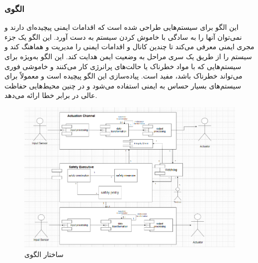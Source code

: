 \subsubsection{الگوی }
\label{archSafeSafetyExecSec}
\begin{RTL}
این الگو \cite{ref4}
برای سیستم‌هایی طراحی شده است که اقدامات ایمنی پیچیده‌ای دارند
و نمی‌توان آنها را به سادگی با خاموش کردن سیستم به دست آورد.
این الگو یک جزء مجری ایمنی معرفی می‌کند تا چندین کانال
و اقدامات ایمنی را مدیریت و هماهنگ کند و سیستم را از طریق
یک سری مراحل به وضعیت ایمن هدایت کند. این الگو به‌ویژه برای سیستم‌هایی
که با مواد خطرناک یا حالت‌های پرانرژی کار می‌کنند و خاموشی فوری می‌تواند
خطرناک باشد، مفید است. پیاده‌سازی این الگو پیچیده است و معمولاً
برای سیستم‌های بسیار حساس به ایمنی استفاده می‌شود و در
چنین محیط‌هایی حفاظت عالی در برابر خطا ارائه می‌دهد.
\end{RTL}
\begin{figure}[h!]
\centering
\includegraphics[scale=0.5]{images/third/safetyExec.png}
\caption{ساختار الگوی }
\end{figure}